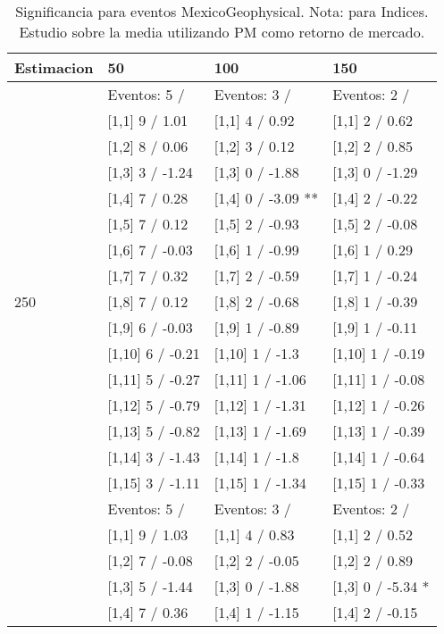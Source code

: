 \begin{table}

\caption{Significancia para eventos MexicoGeophysical. Nota: para Indices. Estudio sobre la media utilizando PM como retorno de mercado.}
\centering
\begin{tabular}[t]{llll}
\toprule
Estimacion & 50 & 100 & 150\\
\midrule
 & Eventos:  5 / & Eventos:  3 / & Eventos:  2 /\\
 & {}[1,1] 9  / 1.01 & {}[1,1] 4  / 0.92 & {}[1,1] 2  / 0.62\\
 & {}[1,2] 8  / 0.06 & {}[1,2] 3  / 0.12 & {}[1,2] 2  / 0.85\\
 & {}[1,3] 3  / -1.24 & {}[1,3] 0  / -1.88 & {}[1,3] 0  / -1.29\\
 & {}[1,4] 7  / 0.28 & {}[1,4] 0  / -3.09 ** & {}[1,4] 2  / -0.22\\
\addlinespace
 & {}[1,5] 7  / 0.12 & {}[1,5] 2  / -0.93 & {}[1,5] 2  / -0.08\\
 & {}[1,6] 7  / -0.03 & {}[1,6] 1  / -0.99 & {}[1,6] 1  / 0.29\\
 & {}[1,7] 7  / 0.32 & {}[1,7] 2  / -0.59 & {}[1,7] 1  / -0.24\\
250 & {}[1,8] 7  / 0.12 & {}[1,8] 2  / -0.68 & {}[1,8] 1  / -0.39\\
 & {}[1,9] 6  / -0.03 & {}[1,9] 1  / -0.89 & {}[1,9] 1  / -0.11\\
\addlinespace
 & {}[1,10] 6  / -0.21 & {}[1,10] 1  / -1.3 & {}[1,10] 1  / -0.19\\
 & {}[1,11] 5  / -0.27 & {}[1,11] 1  / -1.06 & {}[1,11] 1  / -0.08\\
 & {}[1,12] 5  / -0.79 & {}[1,12] 1  / -1.31 & {}[1,12] 1  / -0.26\\
 & {}[1,13] 5  / -0.82 & {}[1,13] 1  / -1.69 & {}[1,13] 1  / -0.39\\
 & {}[1,14] 3  / -1.43 & {}[1,14] 1  / -1.8 & {}[1,14] 1  / -0.64\\
\addlinespace
 & {}[1,15] 3  / -1.11 & {}[1,15] 1  / -1.34 & {}[1,15] 1  / -0.33\\
 & Eventos:  5 / & Eventos:  3 / & Eventos:  2 /\\
 & {}[1,1] 9  / 1.03 & {}[1,1] 4  / 0.83 & {}[1,1] 2  / 0.52\\
 & {}[1,2] 7  / -0.08 & {}[1,2] 2  / -0.05 & {}[1,2] 2  / 0.89\\
 & {}[1,3] 5  / -1.44 & {}[1,3] 0  / -1.88 & {}[1,3] 0  / -5.34 *\\
\addlinespace
 & {}[1,4] 7  / 0.36 & {}[1,4] 1  / -1.15 & {}[1,4] 2  / -0.15\\

\end{tabular}
\end{table}
